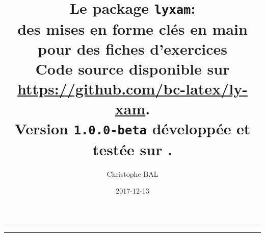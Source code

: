 \documentclass[12pt,a4paper]{scrartcl}
\begin{document}
\renewcommand\labelitemi{\raisebox{0.125em}{\tiny\textbullet}}
\renewcommand{\labelitemii}{---}

\title{%
	Le package \texttt{lyxam}:\\%
	des mises en forme clés en main\\%
	pour des fiches d'exercices\\%
	{\footnotesize Code source disponible sur \url{https://github.com/bc-latex/ly-xam}.}\\%
	{\footnotesize Version \texttt{1.0.0-beta} développée et testée sur \macosxname{}.}%
}
\author{Christophe BAL}
\date{2017-12-13}

\maketitle


\vspace{2em}

\hrule

\tableofcontents

\vspace{1.5em}

\hrule

\newpage

\end{document}
